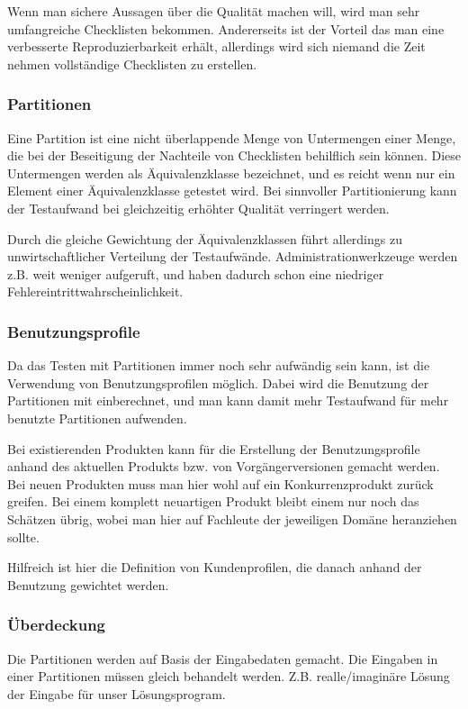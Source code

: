 Wenn man sichere Aussagen über die Qualität machen will, wird man sehr umfangreiche Checklisten bekommen. Andererseits ist der Vorteil das man eine verbesserte Reproduzierbarkeit erhält, allerdings wird sich niemand die Zeit nehmen vollständige Checklisten zu erstellen.

\subsubsection{Partitionen}
Eine Partition ist eine nicht überlappende Menge von Untermengen einer Menge, die bei der Beseitigung der Nachteile von Checklisten behilflich sein können. Diese Untermengen werden als Äquivalenzklasse bezeichnet, und es reicht wenn nur ein Element einer Äquivalenzklasse getestet wird. Bei sinnvoller Partitionierung kann der Testaufwand bei gleichzeitig erhöhter Qualität verringert werden.

Durch die gleiche Gewichtung der Äquivalenzklassen führt allerdings zu unwirtschaftlicher Verteilung der Testaufwände. Administrationwerkzeuge werden z.B. weit weniger aufgeruft, und haben dadurch schon eine niedriger Fehlereintrittwahrscheinlichkeit. 

\subsubsection{Benutzungsprofile}
Da das Testen mit Partitionen immer noch sehr aufwändig sein kann, ist die Verwendung von Benutzungsprofilen möglich. Dabei wird die Benutzung der Partitionen mit einberechnet, und man kann damit mehr Testaufwand für mehr benutzte Partitionen aufwenden.

Bei existierenden Produkten kann für die Erstellung der Benutzungsprofile anhand des aktuellen Produkts bzw. von Vorgängerversionen gemacht werden. Bei neuen Produkten muss man hier wohl auf ein Konkurrenzprodukt zurück greifen. Bei einem komplett neuartigen Produkt bleibt einem nur noch das Schätzen übrig, wobei man hier auf Fachleute der jeweiligen Domäne heranziehen sollte.

Hilfreich ist hier die Definition von Kundenprofilen, die danach anhand der Benutzung gewichtet werden.

\subsubsection{Überdeckung}
Die Partitionen werden auf Basis der Eingabedaten gemacht. Die Eingaben in einer Partitionen müssen gleich behandelt werden. Z.B. realle/imaginäre Lösung der Eingabe für unser Lösungsprogram.

